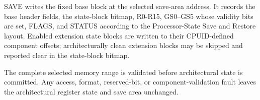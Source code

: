SAVE writes the fixed base block at the selected save-area address. It records the base header fields, the state-block bitmap, R0-R15, GS0--GS5 whose validity bits are set, FLAGS, and STATUS according to the Processor-State Save and Restore layout. Enabled extension state blocks are written to their CPUID-defined component offsets; architecturally clean extension blocks may be skipped and reported clear in the state-block bitmap.

The complete selected memory range is validated before architectural state is committed. Any access, format, reserved-bit, or component-validation fault leaves the architectural register state and save area unchanged.
